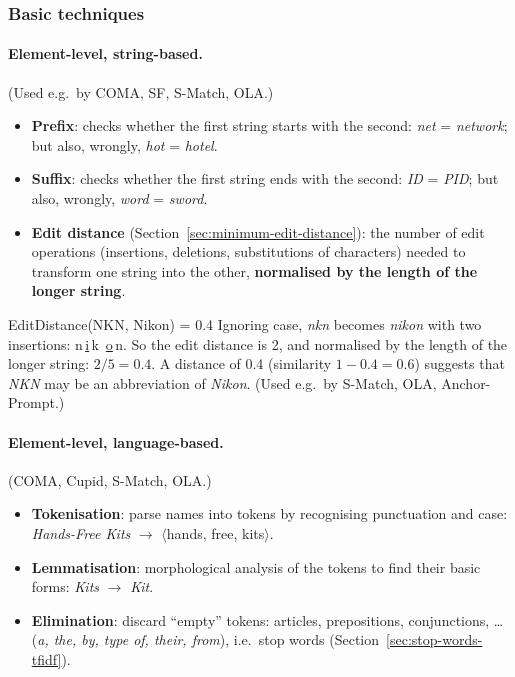\subsubsection{Basic techniques}

\paragraph{Element-level, string-based.} (Used e.g.\ by COMA, SF, S-Match, OLA.)
\begin{itemize}[nosep]
  \item \textbf{Prefix}: checks whether the first string starts with the second:
        \emph{net} = \emph{network}; but also, wrongly, \emph{hot} = \emph{hotel}.
  \item \textbf{Suffix}: checks whether the first string ends with the second: \emph{ID}
        = \emph{PID}; but also, wrongly, \emph{word} = \emph{sword}.
  \item \textbf{Edit distance} (Section~\ref{sec:minimum-edit-distance}): the number of
        edit operations (insertions, deletions, substitutions of characters) needed to
        transform one string into the other, \textbf{normalised by the length of the
        longer string}.
\end{itemize}

\begin{nbexample}{EditDistance(NKN, Nikon) = 0.4}
Ignoring case, \emph{nkn} becomes \emph{nikon} with two insertions: n\,\underline{i}\,k\,%
\underline{o}\,n. So the edit distance is 2, and normalised by the length of the longer
string: $2/5 = 0.4$. A distance of 0.4 (similarity $1-0.4=0.6$) suggests that \emph{NKN}
may be an abbreviation of \emph{Nikon}. (Used e.g.\ by S-Match, OLA, Anchor-Prompt.)
\end{nbexample}

\paragraph{Element-level, language-based.} (COMA, Cupid, S-Match, OLA.)
\begin{itemize}[nosep]
  \item \textbf{Tokenisation}: parse names into tokens by recognising punctuation and
        case: \emph{Hands-Free Kits} $\to$ $\langle$hands, free, kits$\rangle$.
  \item \textbf{Lemmatisation}: morphological analysis of the tokens to find their basic
        forms: \emph{Kits} $\to$ \emph{Kit}.
  \item \textbf{Elimination}: discard ``empty'' tokens: articles, prepositions,
        conjunctions, \ldots (\emph{a, the, by, type of, their, from}), i.e.\ stop words
        (Section~\ref{sec:stop-words-tfidf}).
\end{itemize}

